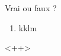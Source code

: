 
\begin{exercice}\label{exo2smath-0164}

    Vrai ou faux ?
    \begin{enumerate}
        \item
            kklm
    \end{enumerate}
    <++>

\end{exercice}
